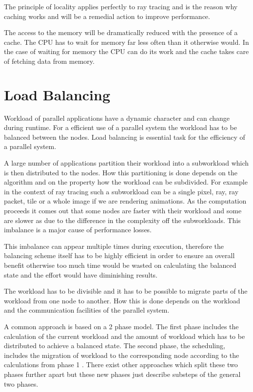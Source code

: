 \documentclass[DIV10, abstracton, openright, footsepline, headsepline, twoside, 9pt,
bigheadings]{scrreprt}
\begin{document}
The principle of locality applies perfectly to ray
tracing and is the reason why caching works and will be a remedial action to
improve performance.

The access to the memory will be dramatically reduced with the presence of a
cache. The CPU has to wait for memory far less often than it otherwise would.
In the case of waiting for memory the CPU can do its work and the cache takes
care of fetching data from memory.


\section{Load Balancing}
\label{sec:analysis_load_balancing}
Workload of parallel applications have a dynamic character and can change
during runtime. For a efficient use of a parallel system the workload has to be
balanced between the nodes. Load balancing is essential task for the efficiency
of a parallel system.

A large number of applications partition their workload into a subworkload which
is then distributed to the nodes. How this partitioning is done depends on the
algorithm and on the property how the workload can be subdivided. For example
in the context of ray tracing such a subworkload can be a single pixel, ray,
ray packet, tile or a whole image if we are rendering animations. As the
computation proceeds it comes out that some nodes are faster with
their workload and some are slower as due to the difference in the complexity
off the subworkloads. This imbalance is a major cause of performance losses.

This imbalance can appear multiple times during execution, therefore the
balancing scheme itself has to be highly efficient in order to ensure an
overall benefit otherwise too much time would be wasted on calculating the
balanced state and the effort would have diminishing results.

The workload has to be divisible and it has to be possible to migrate parts of
the workload from one node to another. How this is done depends on the workload
and the communication facilities of the parallel system.

A common approach is based on a 2 phase model. The first phase includes the
calculation of the current workload and the amount of workload which has to be
distributed to achieve a balanced state. The second phase, the
scheduling, includes the migration of workload to the corresponding node
according to the calculations from phase 1 \cite{Elsaesser98}.
There exist other approaches which split these two phases further apart but
these new phases just describe substeps of the general two phases.
\end{document}
